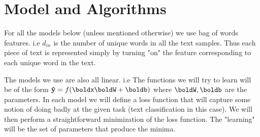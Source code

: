 \documentclass[11pt]{article}
\begin{document}
\section{Model and Algorithms}

For all the models below (unless mentioned otherwise) we use bag of words
features. i.e $d_{in}$ is the number of unique words in all the text samples.
Thus each piece of text is represented simply by turning "on" the feature
corresponding to each unique word in the text.

The models we use are also all linear. i.e The functions we will try to learn
will be of the form $\bold{\hat{y}} = f(\boldx \boldW + \boldb)$ where $\boldW,\boldb$
are the parameters. In each model we will define a loss function that will
capture some notion of doing badly at the given task (text classification in
this case). We will then perform a straightforward minimization of the loss
function. The "learning" will be the set of parameters that produce the minima.
\end{document}
